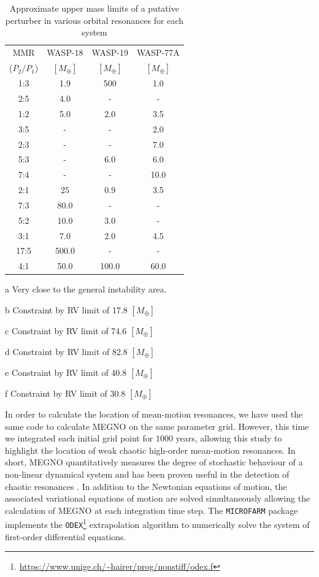 \begin{table}[ht]
\centering
\begin{threeparttable}
\caption{Approximate upper mass limits of a putative perturber in various orbital resonances for each system}
\label{masstable}
\begin{tabular}{cccc}
\hline \hline
MMR & WASP-18 & WASP-19 & WASP-77A \\
($P_{2}/P_{1}$) & $[M_{\oplus}]$ & $[M_{\oplus}]$ & $[M_{\oplus}]$ \\
\hline
1:3 & 1.9    & 500\tnote{b} & 1.0 \\
2:5 & 4.0    & -   & -   \\
1:2 & 5.0\tnote{a} & 2.0 & 3.5 \\
3:5 & -      & -      & 2.0 \\
2:3 & -      & -      & 7.0\tnote{a} \\
5:3 & -      & 6.0    & 6.0   \\
7:4 & -      & -      & 10.0 \\
2:1 & 25\tnote{a}    & 0.9    & 3.5 \\
7:3 & 80.0\tnote{c}   & -      & -   \\
5:2 & 10.0   & 3.0    & -   \\
3:1 & 7.0    & 2.0    & 4.5 \\
17:5 & 500.0\tnote{d} & -      & -    \\
4:1 & 50.0   & 100.0\tnote{e}  & 60.0\tnote{f} \\
\hline
\end{tabular}
\begin{tablenotes}
\item[a] Very close to the general instability area.
\item[b] Constraint by RV limit of 17.8 $[M_{\oplus}]$
\item[c] Constraint by RV limit of 74.6 $[M_{\oplus}]$
\item[d] Constraint by RV limit of 82.8 $[M_{\oplus}]$
\item[e] Constraint by RV limit of 40.8 $[M_{\oplus}]$
\item[f] Constraint by RV limit of 30.8 $[M_{\oplus}]$
\end{tablenotes}
\end{threeparttable}
\end{table} 

In order to calculate the location of mean-motion resonances, we have used the same code to calculate MEGNO on the same parameter grid. However, this time we integrated each initial grid point for 1000 years, allowing this study to highlight the location of weak chaotic high-order mean-motion resonances. In short, MEGNO quantitatively measures the degree of stochastic behaviour of a non-linear dynamical system and has been proven useful in the detection of chaotic resonances \citep{go2001, hi2010}. In addition to the Newtonian equations of motion, the associated variational equations of motion are solved simultaneously allowing the calculation of MEGNO at each integration time step. The \texttt{MICROFARM} package implements the \texttt{ODEX}\footnote{\url{https://www.unige.ch/~hairer/prog/nonstiff/odex.f}} extrapolation algorithm to numerically solve the system of first-order differential equations.


